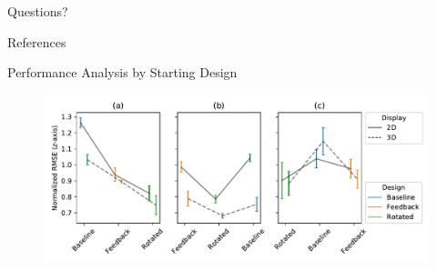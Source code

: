 \documentclass[10pt]{beamer}
\newcommand{\themename}{\textbf{\textsc{metropolis}}\xspace}
\begin{document}
\begin{frame}[standout]
  Questions?
\end{frame}

\appendix





\begin{frame}[allowframebreaks]{References}
  
  
\end{frame}

\begin{frame}[fragile]{Performance Analysis by Starting Design}
\begin{figure}
  \begin{center}
    \includegraphics[width=\linewidth]{../img/x_design_y_zrmse_col_startdesign_hue_device.pdf}
  \end{center}
\end{figure}
\end{frame}
\end{document}
